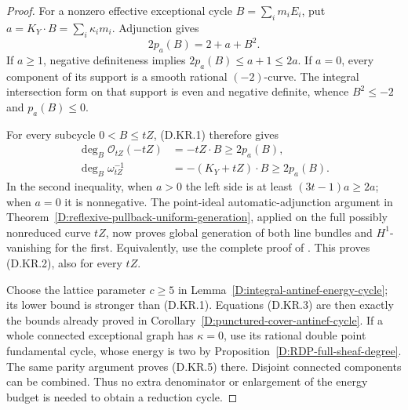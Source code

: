 \begin{proof}
For a nonzero effective exceptional cycle $B=\sum_i m_iE_i$,
put $a=K_Y\cdot B=\sum_i\kappa_i m_i$. Adjunction gives
\[
                    2p_a(B)=2+a+B^2.                 \tag{D.KR.4}
\]
If $a\ge1$, negative definiteness implies
$2p_a(B)\le a+1\le2a$. If $a=0$, every component of its support
is a smooth rational $(-2)$-curve. The integral intersection
form on that support is even and negative definite, whence
$B^2\le-2$ and $p_a(B)\le0$.

For every subcycle $0<B\le tZ$, (D.KR.1) therefore gives
\[
 \begin{split}
 \deg_B\mathcal O_{tZ}(-tZ)&=-tZ\cdot B\ge2p_a(B),\\
 \deg_B\omega_{tZ}^{-1}&=-(K_Y+tZ)\cdot B
                              \ge2p_a(B).
 \end{split}                                           \tag{D.KR.5}
\]
In the second inequality, when $a>0$ the left side is at least
$(3t-1)a\ge2a$; when $a=0$ it is nonnegative.
The point-ideal automatic-adjunction argument in
Theorem~\ref{D:reflexive-pullback-uniform-generation}, applied
on the full possibly nonreduced curve $tZ$, now proves global
generation of both line bundles and $H^1$-vanishing for the
first. Equivalently, use the complete proof of
\citet[Lemma~2.4 and Theorem~1.1, pp.~192--193]{C_CFHR1999}.
This proves (D.KR.2), also for every $tZ$.

Choose the lattice parameter $c\ge5$ in
Lemma~\ref{D:integral-antinef-energy-cycle}; its lower bound is
stronger than (D.KR.1). Equations (D.KR.3) are then exactly the
bounds already proved in
Corollary~\ref{D:punctured-cover-antinef-cycle}. If a whole
connected exceptional graph has $\kappa=0$, use its rational
double point fundamental cycle, whose energy is two by
Proposition~\ref{D:RDP-full-sheaf-degree}. The same parity
argument proves (D.KR.5) there. Disjoint connected components
can be combined. Thus no extra denominator or enlargement of
the energy budget is needed to obtain a reduction cycle.
\end{proof}

